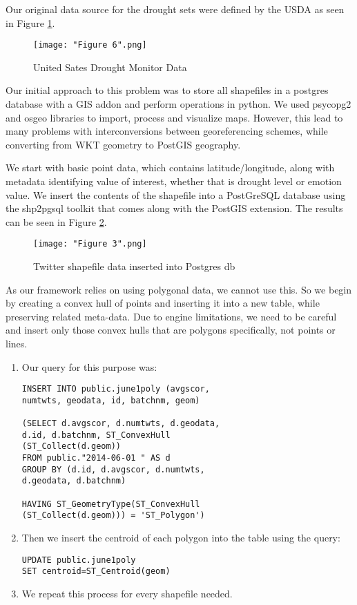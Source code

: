 \documentclass[conference]{IEEEtran}
\begin{document}
Our original data source for the drought sets were defined by the USDA as seen in Figure \ref{Figure 6}.

\begin{figure}[ht]
\centerline{\texttt{[image: "Figure 6".png]}}
\caption{United Sates Drought Monitor Data}
\label{Figure 6}
\end{figure}

Our initial approach to this problem was to store all shapefiles in a postgres database with a GIS addon and perform operations in python. We used psycopg2 and osgeo libraries to import, process and visualize maps. However, this lead to many problems with interconversions between georeferencing schemes, while converting from WKT geometry to PostGIS geography.

We start with basic point data, which contains latitude/longitude, along with metadata identifying value of interest, whether that is drought level or emotion value. We insert the contents of the shapefile into a PostGreSQL database using the shp2pgsql toolkit that comes along with the PostGIS extension. The results can be seen in Figure \ref{Figure 3}.

\begin{figure}[ht]
\centerline{\texttt{[image: "Figure 3".png]}}
\caption{Twitter shapefile data inserted into Postgres db}
\label{Figure 3}
\end{figure}

As our framework relies on using polygonal data, we cannot use this. So we begin by creating a convex hull of points and inserting it into a new table, while preserving related meta-data. Due to engine limitations, we need to be careful and insert only those convex hulls that are polygons specifically, not points or lines.

\begin{enumerate}
	\item Our query for this purpose was:
\begin{lstlisting}
INSERT INTO public.june1poly (avgscor, 
numtwts, geodata, id, batchnm, geom)

(SELECT d.avgscor, d.numtwts, d.geodata, 
d.id, d.batchnm, ST_ConvexHull
(ST_Collect(d.geom))
FROM public."2014-06-01 " AS d
GROUP BY (d.id, d.avgscor, d.numtwts,
d.geodata, d.batchnm)

HAVING ST_GeometryType(ST_ConvexHull
(ST_Collect(d.geom))) = 'ST_Polygon')
\end{lstlisting}
	\item Then we insert the centroid of each polygon into the table using the query:

\begin{lstlisting}
UPDATE public.june1poly 
SET centroid=ST_Centroid(geom)
\end{lstlisting}

	\item We repeat this process for every shapefile needed.
\end{enumerate}
\end{document}
